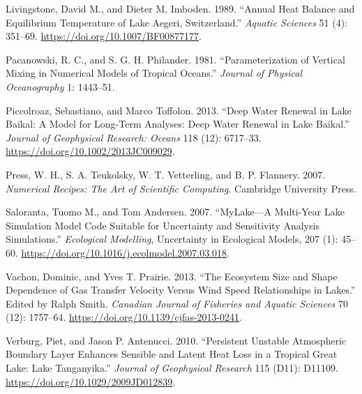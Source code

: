 \documentclass[
  letterpaper,
  DIV=11,
  numbers=noendperiod]{scrartcl}
\newlength{\cslhangindent}
\newlength{\cslentryspacingunit} %
\newenvironment{CSLReferences}[2] %
 {%
  \setlength{\parindent}{0pt}
  \ifodd #1
  \let\oldpar\par
  \def\par{\hangindent=\cslhangindent\oldpar}
  \fi
  \setlength{\parskip}{#2\cslentryspacingunit}
 }%
 {}
\begin{document}
\begin{CSLReferences}{1}{0}
\leavevmode{}%
Livingstone, David M., and Dieter M. Imboden. 1989. {``Annual Heat
Balance and Equilibrium Temperature of {Lake} {Aegeri},
{Switzerland}.''} \emph{Aquatic Sciences} 51 (4): 351--69.
\url{https://doi.org/10.1007/BF00877177}.

\leavevmode{}%
Pacanowski, R. C., and S. G. H. Philander. 1981. {``{Parameterization of
Vertical Mixing in Numerical Models of Tropical Oceans}.''}
\emph{Journal of Physical Oceanography} 1: 1443--51.

\leavevmode{}%
Piccolroaz, Sebastiano, and Marco Toffolon. 2013. {``Deep Water Renewal
in {Lake} {Baikal}: {A} Model for Long-Term Analyses: {Deep} {Water}
{Renewal} in {Lake} {Baikal}.''} \emph{Journal of Geophysical Research:
Oceans} 118 (12): 6717--33. \url{https://doi.org/10.1002/2013JC009029}.

\leavevmode{}%
Press, W. H., S. A. Teukolsky, W. T. Vetterling, and B. P. Flannery.
2007. \emph{{Numerical} {Recipes:} {The} {Art} of {Scientific}
{Computing}}. Cambridge University Press.

\leavevmode{}%
Saloranta, Tuomo M., and Tom Andersen. 2007. {``{MyLake}---{A}
Multi-Year Lake Simulation Model Code Suitable for Uncertainty and
Sensitivity Analysis Simulations.''} \emph{Ecological Modelling},
Uncertainty in {Ecological} {Models}, 207 (1): 45--60.
\url{https://doi.org/10.1016/j.ecolmodel.2007.03.018}.

\leavevmode{}%
Vachon, Dominic, and Yves T. Prairie. 2013. {``The Ecosystem Size and
Shape Dependence of Gas Transfer Velocity Versus Wind Speed
Relationships in Lakes.''} Edited by Ralph Smith. \emph{Canadian Journal
of Fisheries and Aquatic Sciences} 70 (12): 1757--64.
\url{https://doi.org/10.1139/cjfas-2013-0241}.

\leavevmode{}%
Verburg, Piet, and Jason P. Antenucci. 2010. {``Persistent Unstable
Atmospheric Boundary Layer Enhances Sensible and Latent Heat Loss in a
Tropical Great Lake: {Lake} {Tanganyika}.''} \emph{Journal of
Geophysical Research} 115 (D11): D11109.
\url{https://doi.org/10.1029/2009JD012839}.

\end{CSLReferences}
\end{document}

